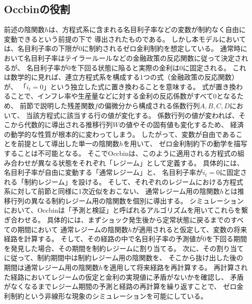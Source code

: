 
\subsection{Occbinの役割}
\label{sec:chapter4_method_occbin}
前述の陰関数\(h\)は、方程式系に含まれる名目利子率などの変数が制約なく自由に変動できるという前提の下で
導出されたものである。
しかし本モデルにおいては、名目利子率の下限が0に制約されるゼロ金利制約を想定している。
通常時において名目利子率はテイラールールなどの金融政策の反応関数に従って決定されるが、
名目利子率が0を下回る状態に陥ると実際の金利は0に固定される。
これは数学的に見れば、連立方程式系を構成する1つの式（金融政策の反応関数）が、
「\(i_t=0\)」という独立した式に置き換わることを意味する。
式が置き換わることで、インフレ率や生産量などに対する金利の反応係数がすべて0となるため、
前節で説明した残差関数\(f\)の偏微分から構成される係数行列\(A,B,C,D\)において、
当該方程式に該当する行の値が変化する。
係数行列の値が変われば、そこから代数的に導出される推移行列\(W\)の値やその固有値も変化するため、
経済の動学的な性質が根本的に変わってしまう。
したがって、変数が自由であることを前提として導出した単一の陰関数\(h\)を用いて、
ゼロ金利制約下の動学を描写することは不可能となる。
そこでOccbinは、このように適用される方程式の組み合わせが異なる状態をそれぞれ「レジーム」として定義する。
具体的には、名目利子率が自由に変動する「通常レジーム」と、
名目利子率が\(i_t=0\)に固定される「制約レジーム」を設ける。
そして、それぞれのレジームにおける方程式系に対して前節と同様に1次近似をおこない、
通常レジーム用の陰関数\(h\)とは推移行列の異なる制約レジーム用の陰関数を個別に導出する。
シミュレーションにおいて、Occbinは「予測と検証」と呼ばれるアルゴリズムを用いてこれらを繋ぎ合わせる。
具体的には、まずショック発生後から定常状態に戻るまでのすべての期間において
通常レジームの陰関数\(h\)が適用されると仮定して、変数の将来経路を計算する。
そして、その経路の中で名目利子率の予測値が0を下回る期間を発見した場合、その期間を制約レジームに割り当てる。
次に、その割り当てに従って、制約期間中は制約レジーム用の陰関数を、
そこから抜け出した後の期間は通常レジーム用の陰関数\(h\)を適用して将来経路を再計算する。
再計算された経路においてレジームの仮定と金利の実現値に矛盾がないかを確認し、
矛盾がなくなるまでレジーム期間の予測と経路の再計算を繰り返すことで、
ゼロ金利制約という非線形な現象のシミュレーションを可能にしている。